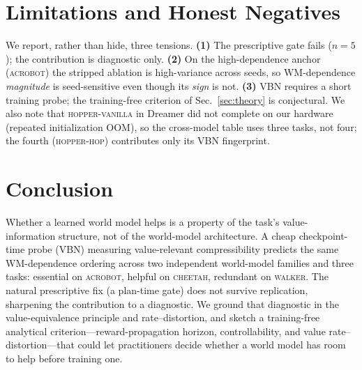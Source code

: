 \documentclass[twocolumn,10pt]{article}
\begin{document}
\section{Limitations and Honest Negatives}
We report, rather than hide, three tensions. \textbf{(1)} The prescriptive
gate fails ($n{=}5$); the contribution is diagnostic only. \textbf{(2)} On the
high-dependence anchor (\textsc{acrobot}) the stripped ablation is
high-variance across seeds, so WM-dependence \emph{magnitude} is seed-sensitive
even though its \emph{sign} is not. \textbf{(3)} VBN requires a short training
probe; the training-free criterion of Sec.~\ref{sec:theory} is conjectural. We
also note that \textsc{hopper-vanilla} in Dreamer did not complete on our
hardware (repeated initialization OOM), so the cross-model table uses three
tasks, not four; the fourth (\textsc{hopper-hop}) contributes only its VBN
fingerprint.

\section{Conclusion}
Whether a learned world model helps is a property of the task's
value-information structure, not of the world-model architecture. A cheap
checkpoint-time probe (VBN) measuring value-relevant compressibility predicts
the same WM-dependence ordering across two independent world-model families
and three tasks: essential on \textsc{acrobot}, helpful on \textsc{cheetah},
redundant on \textsc{walker}. The natural prescriptive fix (a plan-time gate)
does not survive replication, sharpening the contribution to a diagnostic. We
ground that diagnostic in the value-equivalence principle and rate--distortion,
and sketch a training-free analytical criterion---reward-propagation horizon,
controllability, and value rate--distortion---that could let practitioners
decide whether a world model has room to help before training one.
\end{document}

